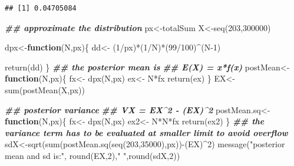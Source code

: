 \documentclass[
]{book}
\newenvironment{Shaded}{\begin{snugshade}}{\end{snugshade}}
\newcommand{\ControlFlowTok}[1]{\textcolor[rgb]{0.13,0.29,0.53}{\textbf{#1}}}
\newcommand{\DecValTok}[1]{\textcolor[rgb]{0.00,0.00,0.81}{#1}}
\newcommand{\DocumentationTok}[1]{\textcolor[rgb]{0.56,0.35,0.01}{\textbf{\textit{#1}}}}
\newcommand{\FunctionTok}[1]{\textcolor[rgb]{0.00,0.00,0.00}{#1}}
\newcommand{\NormalTok}[1]{#1}
\newcommand{\OtherTok}[1]{\textcolor[rgb]{0.56,0.35,0.01}{#1}}
\newcommand{\SpecialCharTok}[1]{\textcolor[rgb]{0.00,0.00,0.00}{#1}}
\newcommand{\StringTok}[1]{\textcolor[rgb]{0.31,0.60,0.02}{#1}}
\theoremstyle{definition}
\theoremstyle{definition}
\theoremstyle{definition}
\theoremstyle{definition}
\theoremstyle{remark}
\begin{document}
\begin{verbatim}
## [1] 0.04705084
\end{verbatim}

\begin{Shaded}
\begin{Highlighting}[]
 \DocumentationTok{\#\# approximate the distribution}
\NormalTok{ px}\OtherTok{\textless{}{-}}\NormalTok{totalSum}
\NormalTok{ X}\OtherTok{\textless{}{-}}\FunctionTok{seq}\NormalTok{(}\DecValTok{203}\NormalTok{,}\DecValTok{300000}\NormalTok{)}
 
\NormalTok{ dpx}\OtherTok{\textless{}{-}}\ControlFlowTok{function}\NormalTok{(N,px)\{}
\NormalTok{   dd}\OtherTok{\textless{}{-}}\NormalTok{ (}\DecValTok{1}\SpecialCharTok{/}\NormalTok{px)}\SpecialCharTok{*}\NormalTok{(}\DecValTok{1}\SpecialCharTok{/}\NormalTok{N)}\SpecialCharTok{*}\NormalTok{(}\DecValTok{99}\SpecialCharTok{/}\DecValTok{100}\NormalTok{)}\SpecialCharTok{\^{}}\NormalTok{(N}\DecValTok{{-}1}\NormalTok{)}
   
   \FunctionTok{return}\NormalTok{(dd)}
\NormalTok{ \}}
 \DocumentationTok{\#\# the posterior mean is}
  \DocumentationTok{\#\# E(X) = x*f(x)}
\NormalTok{ postMean}\OtherTok{\textless{}{-}}\ControlFlowTok{function}\NormalTok{(N,px)\{}
\NormalTok{   fx}\OtherTok{\textless{}{-}} \FunctionTok{dpx}\NormalTok{(N,px)}
\NormalTok{   ex}\OtherTok{\textless{}{-}}\NormalTok{ N}\SpecialCharTok{*}\NormalTok{fx}
   \FunctionTok{return}\NormalTok{(ex)}
\NormalTok{ \}}
\NormalTok{  EX}\OtherTok{\textless{}{-}}\FunctionTok{sum}\NormalTok{(}\FunctionTok{postMean}\NormalTok{(X,px))}
  
\DocumentationTok{\#\# posterior variance}
   \DocumentationTok{\#\# VX = EX\^{}2 {-} (EX)\^{}2}
\NormalTok{postMean.sq}\OtherTok{\textless{}{-}}\ControlFlowTok{function}\NormalTok{(N,px)\{}
\NormalTok{   fx}\OtherTok{\textless{}{-}} \FunctionTok{dpx}\NormalTok{(N,px)}
\NormalTok{   ex2}\OtherTok{\textless{}{-}}\NormalTok{ N}\SpecialCharTok{*}\NormalTok{N}\SpecialCharTok{*}\NormalTok{fx}
   \FunctionTok{return}\NormalTok{(ex2)}
\NormalTok{\}}
 \DocumentationTok{\#\# the variance term has to be evaluated at smaller limit to avoid overflow}
\NormalTok{sdX}\OtherTok{\textless{}{-}}\FunctionTok{sqrt}\NormalTok{(}\FunctionTok{sum}\NormalTok{(}\FunctionTok{postMean.sq}\NormalTok{(}\FunctionTok{seq}\NormalTok{(}\DecValTok{203}\NormalTok{,}\DecValTok{35000}\NormalTok{),px))}\SpecialCharTok{{-}}\NormalTok{(EX)}\SpecialCharTok{\^{}}\DecValTok{2}\NormalTok{)}
\FunctionTok{message}\NormalTok{(}\StringTok{"posterior mean and sd is:"}\NormalTok{, }\FunctionTok{round}\NormalTok{(EX,}\DecValTok{2}\NormalTok{),}\StringTok{" "}\NormalTok{,}\FunctionTok{round}\NormalTok{(sdX,}\DecValTok{2}\NormalTok{))}
\end{Highlighting}
\end{Shaded}
\end{document}

